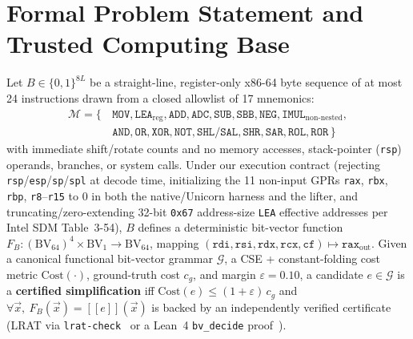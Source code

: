 \documentclass[11pt,a4paper]{article}
\begin{document}
\section{Formal Problem Statement and Trusted Computing Base}

Let $B \in \{0,1\}^{8L}$ be a straight-line, register-only x86-64 byte sequence of at most 24 instructions drawn from a closed allowlist of 17 mnemonics:
\begin{align*}
\mathcal{M} = \{\,&\texttt{MOV}, \texttt{LEA}_{\mathrm{reg}}, \texttt{ADD}, \texttt{ADC}, \texttt{SUB}, \texttt{SBB}, \texttt{NEG}, \texttt{IMUL}_{\mathrm{non\text{-}nested}},\\
&\texttt{AND}, \texttt{OR}, \texttt{XOR}, \texttt{NOT}, \texttt{SHL}/\texttt{SAL}, \texttt{SHR}, \texttt{SAR}, \texttt{ROL}, \texttt{ROR}\,\}
\end{align*}
with immediate shift/rotate counts and no memory accesses, stack-pointer (\texttt{rsp}) operands, branches, or system calls. Under our execution contract (rejecting \texttt{rsp}/\texttt{esp}/\texttt{sp}/\texttt{spl} at decode time, initializing the 11 non-input GPRs \texttt{rax}, \texttt{rbx}, \texttt{rbp}, \texttt{r8}--\texttt{r15} to $0$ in both the native/Unicorn harness and the lifter, and truncating/zero-extending 32-bit \texttt{0x67} address-size \texttt{LEA} effective addresses per Intel SDM Table~3-54), $B$ defines a deterministic bit-vector function $F_B : (\mathrm{BV}_{64})^4 \times \mathrm{BV}_1 \to \mathrm{BV}_{64}$, mapping $(\texttt{rdi}, \texttt{rsi}, \texttt{rdx}, \texttt{rcx}, \texttt{cf}) \mapsto \texttt{rax}_{\mathrm{out}}$. Given a canonical functional bit-vector grammar $\mathcal{G}$, a CSE + constant-folding cost metric $\mathrm{Cost}(\cdot)$, ground-truth cost $c_g$, and margin $\varepsilon = 0.10$, a candidate $e \in \mathcal{G}$ is a \textbf{certified simplification} iff $\mathrm{Cost}(e) \le (1+\varepsilon)\,c_g$ and $\forall \vec{x},\ F_B(\vec{x}) = [\![ e ]\!](\vec{x})$ is backed by an independently verified certificate (LRAT via \texttt{lrat-check}~\cite{lrat2017} or a Lean~4 \texttt{bv\_decide} proof~\cite{lean4_2021}).
\end{document}
